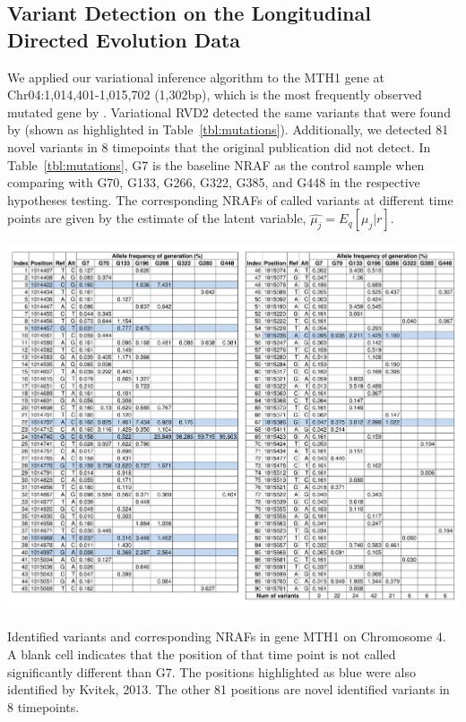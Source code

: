 \documentclass[11pt,reqno]{amsart}
\begin{document}
\subsection{Variant Detection on the Longitudinal Directed Evolution Data}
We applied our variational inference algorithm to the MTH1 gene at Chr04:1,014,401-1,015,702 (1,302bp), which is the most frequently observed mutated gene by \citet{kvitek2013whole}.
Variational RVD2 detected the same variants that were found by \citet{kvitek2013whole} (shown as highlighted in Table~\ref{tbl:mutations}).
Additionally, we detected 81 novel variants in 8 timepoints that the original publication did not detect.
In Table~\ref{tbl:mutations}, G7 is the baseline NRAF as the control sample when comparing with G70, G133, G266, G322, G385, and G448 in the respective hypotheses testing.
The corresponding NRAFs of called variants at different time points are given by the estimate of the latent variable, $\hat{\mu_j} = E_q[\mu_j|r]$.
\begin{table}[htbp]
\centering
\includegraphics[width=1.0\textwidth]{tables/mutations_MTH1.png}
\caption{Identified variants and corresponding NRAFs in gene MTH1 on Chromosome 4.
A blank cell indicates that the position of that time point is not called significantly different than G7.
The positions highlighted as blue were also identified by Kvitek, 2013.
The other 81 positions are novel identified variants in 8 timepoints.}
\label{tbl:mutations}
\end{table}
\end{document}
